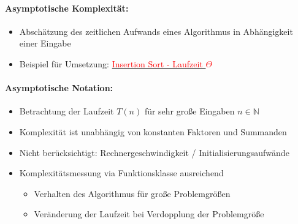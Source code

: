 \documentclass[
    ngerman,
    color=3b,
    dark_mode,
    load_common, %
    summary,
    boxarc,
]{rubos-tuda-template}
\begin{document}
\paragraph{Asymptotische Komplexität:}
\begin{itemize}
    \item Abschätzung des zeitlichen Aufwands eines Algorithmus in Abhängigkeit einer Eingabe
    \item Beispiel für Umsetzung: \hyperref[insSortLaufzeitTheta]{\textcolor{red}{Insertion Sort - Laufzeit $\Theta$}}
\end{itemize}

\paragraph{Asymptotische Notation:}
\begin{itemize}
    \item Betrachtung der Laufzeit $T(n)$ für sehr gro\ss e Eingaben $n \in \mathbb{N}$
    \item Komplexität ist unabhängig von konstanten Faktoren und Summanden
    \item Nicht berücksichtigt: Rechnergeschwindigkeit / Initialisierungsaufwände
    \item Komplexitätsmessung via Funktionsklasse ausreichend
          \begin{itemize}
              \item Verhalten des Algorithmus für gro\ss e Problemgrö\ss en
              \item Veränderung der Laufzeit bei Verdopplung der Problemgrö\ss e
          \end{itemize}
\end{itemize}
\end{document}
